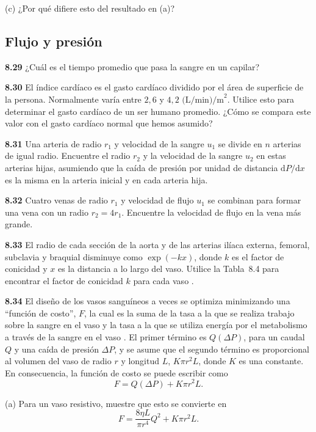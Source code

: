 \documentclass[12pt]{book}
\begin{document}
(c) ¿Por qué difiere esto del resultado en (a)?

\subsection*{Flujo y presión}

\textbf{8.29} ¿Cuál es el tiempo promedio que pasa la sangre en un capilar?

\textbf{8.30} El índice cardíaco es el gasto cardíaco dividido por el área de superficie de la persona. Normalmente varía entre $2{,}6$ y $4{,}2\text{ (L/min)/m}^2$. Utilice esto para determinar el gasto cardíaco de un ser humano promedio. ¿Cómo se compara este valor con el gasto cardíaco normal que hemos asumido?

\textbf{8.31} Una arteria de radio $r_1$ y velocidad de la sangre $u_1$ se divide en $n$ arterias de igual radio. Encuentre el radio $r_2$ y la velocidad de la sangre $u_2$ en estas arterias hijas, asumiendo que la caída de presión por unidad de distancia $\mathrm{d}P/\mathrm{d}x$ es la misma en la arteria inicial y en cada arteria hija.

\textbf{8.32} Cuatro venas de radio $r_1$ y velocidad de flujo $u_1$ se combinan para formar una vena con un radio $r_2 = 4r_1$. Encuentre la velocidad de flujo en la vena más grande.

\textbf{8.33} El radio de cada sección de la aorta y de las arterias ilíaca externa, femoral, subclavia y braquial disminuye como $\exp(-kx)$, donde $k$ es el factor de conicidad y $x$ es la distancia a lo largo del vaso. Utilice la Tabla~8.4 para encontrar el factor de conicidad $k$ para cada vaso \cite{57}.

\textbf{8.34} El diseño de los vasos sanguíneos a veces se optimiza minimizando una ``función de costo'', $F$, la cual es la suma de la tasa a la que se realiza trabajo sobre la sangre en el vaso y la tasa a la que se utiliza energía por el metabolismo a través de la sangre en el vaso \cite{24}. El primer término es $Q(\Delta P)$, para un caudal $Q$ y una caída de presión $\Delta P$, y se asume que el segundo término es proporcional al volumen del vaso de radio $r$ y longitud $L$, $K\pi r^2 L$, donde $K$ es una constante. En consecuencia, la función de costo se puede escribir como
\begin{equation}
F = Q(\Delta P) + K\pi r^2 L.
\label{eq:8114}
\end{equation}

(a) Para un vaso resistivo, muestre que esto se convierte en
\begin{equation}
F = \frac{8\eta L}{\pi r^4} Q^2 + K\pi r^2 L.
\label{eq:8115}
\end{equation}
\end{document}
